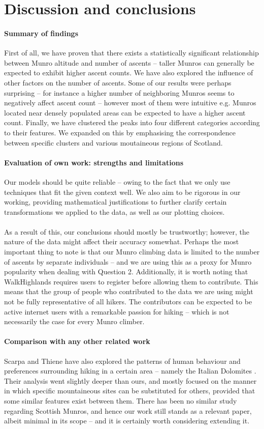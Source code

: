 \documentclass[11pt,a4paper]{article}
\begin{document}
\section{Discussion and conclusions}

\paragraph{Summary of findings}
First of all, we have proven that there exists a statistically significant relationship between Munro altitude and number of ascents – taller Munros can generally be expected to exhibit higher ascent counts. We have also explored the influence of other factors on the number of ascents. Some of our results were perhaps surprising – for instance a higher number of neighboring Munros seems to negatively affect ascent count – however most of them were intuitive e.g. Munros located near densely populated areas can be expected to have a higher ascent count. Finally, we have clustered the peaks into four different categories according to their features. We expanded on this by emphasising the correspondence between specific clusters and various moutaineous regions of Scotland.
\paragraph{Evaluation of own work: strengths and limitations}
Our models should be quite reliable – owing to the fact that we only use techniques that fit the given context well. We also aim to be rigorous in our working, providing mathematical justifications to further clarify certain transformations we applied to the data, as well as our plotting choices. \\ \\
As a result of this, our conclusions should mostly be trustworthy; however, the nature of the data might affect their accuracy somewhat. Perhaps the most important thing to note is that our Munro climbing data is limited to the number of ascents by separate individuals – and we are using this as a proxy for Munro popularity when dealing with Question 2. Additionally, it is worth noting that WalkHighlands requires users to register before allowing them to contribute. This means that the group of people who contributed to the data we are using might not be fully representative of all hikers. The contributors can be expected to be active internet users with a remarkable passion for hiking – which is not necessarily the case for every Munro climber.
\paragraph{Comparison with any other related work}
Scarpa and Thiene have also explored the patterns of human behaviour and preferences surrounding hiking in a certain area – namely the Italian Dolomites \cite{HitA}. Their analysis went slightly deeper than ours, and mostly focused on the manner in which specific mountaineous sites can be substituted for others, provided that some similar features exist between them. There has been no similar study regarding Scottish Munros, and hence our work still stands as a relevant paper, albeit minimal in its scope – and it is certainly worth considering extending it.
\end{document}
